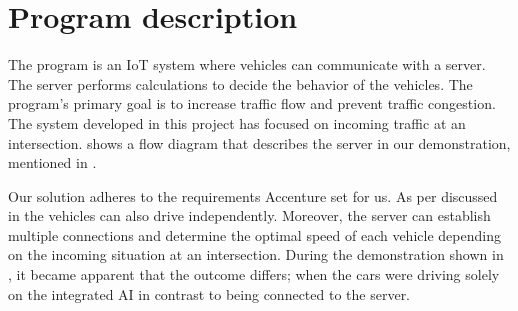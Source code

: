 \chapter{Program description}
The program is an IoT system where vehicles can communicate with a server. The server performs calculations to decide the behavior of the vehicles. The program's primary goal is to increase traffic flow and prevent traffic congestion. The system developed in this project has focused on incoming traffic at an intersection.  shows a flow diagram that describes the server in our demonstration, mentioned in .

Our solution adheres to the requirements Accenture set for us. As per discussed in  the vehicles can also drive independently. Moreover, the server can establish multiple connections and determine the optimal speed of each vehicle depending on the incoming situation at an intersection. During the demonstration shown in , it became apparent that the outcome differs; when the cars were driving solely on the integrated AI in contrast to being connected to the server.
